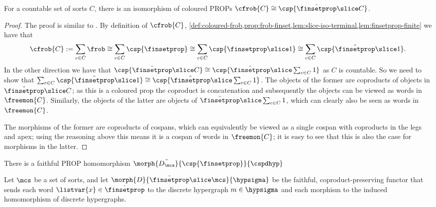 \begin{theorem}
    \label{thm:cfrobc-iso-hatfinsetprop-slice-c}
    For a countable set of sorts \(C\), there is an isomorphism of coloured
    PROPs \(\cfrob{C} \cong \csp{\hat{\finsetprop} \slice C}\).
\end{theorem}
\begin{proof}
    The proof is similar to \cite[Thm. 2.24]{bonchi2022string}.
    By definition of \(\cfrob{C}\),
    \cref{def:coloured-frob,prop:frob-finset,lem:slice-iso-terminal,lem:finsetprop-finite}
    we have that \[
        \cfrob{C}
        :=
        \sum_{c \in C}\frob
        \cong
        \sum_{c \in C}\csp{\finsetprop}
        \cong
        \sum_{c \in C}\csp{\finsetprop \slice 1}
        \cong
        \sum_{c \in C}\csp{\hat{\finsetprop} \slice 1}.
    \]
    In the other direction we have that \(
        \csp{\hat{\finsetprop} \slice C}
        \cong
        \csp{\hat{\finsetprop} \slice \sum_{c \in C} 1}
    \) as \(C\) is countable.
    So we need to show that \(
        \sum_{c \in C}\csp{\hat{\finsetprop} \slice 1}
        \cong
        \csp{\hat{\finsetprop} \slice \sum_{c \in C} 1}
    \).
    The objects of the former are coproducts of objects in
    \(\hat{\finsetprop} \slice C\); as this is a coloured prop the coproduct is
    concatenation and subsequently the objects can be viewed as words in
    \(\freemon{C}\).
    Similarly, the objects of the latter are objects of
    \(\hat{\finsetprop} \slice \sum_{c \in C} 1\), which can clearly also be
    seen as words in \(\freemon{C}\).

    The morphisms of the former are coproducts of cospans, which can
    equivalently be viewed as a single cospan with coproducts in the legs and
    apex; using the reasoning above this means it is a cospan of words in
    \(\freemon{C}\); it is easy to see that this is also the case for morphisms
    in the latter.
\end{proof}


\begin{corollary}
    There is a faithful PROP homomorphism
    \(\morph{\tilde{D_\mcs}}{\csp{\finsetprop}}{\cspdhyp}\)
\end{corollary}

\begin{definition}
    Let \(\mcs\) be a set of sorts, and let
    \(\morph{D}{\hat{\finsetprop} \slice \mcs}{\hypsigma}\) be the faithful,
    coproduct-preserving functor that sends each word
    \(\listvar{x} \in \hat{\finsetprop}\) to the discrete hypergraph
    \(m \in \hypsigma\) and each morphism to the induced homomorphism of
    discrete hypergraphs.
\end{definition}

